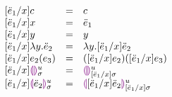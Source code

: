 \begin{figure}[h!]
\[
\begin{array}{lcl}
[\dexp_1 / x] c
&=&
c\\
{[\dexp_1 / x] x}
&=&
\dexp_1\\
{[\dexp_1 / x] y}
&=&
y\\
{[\dexp_1 / x] \dlam{y}{\dexp_2}}
&=&
{\dlam{y}{[\dexp_1 / x] \dexp_2}}
\\
{[\dexp_1 / x] \dap{e_2}{e_3}}
&=&
{\dapP{[\dexp_1 / x] e_2}{[\dexp_1 / x] e_3}}
\\
{[\dexp_1 / x]} \dehole{\mvar}{\subst}
&=&
\dehole{\mvar}{[\dexp_1 / x] \subst}
\\
{[\dexp_1 / x] \dhole{\dexp_2}{\mvar}{\subst}}
&=& 
\dhole{ [ \dexp_1 / x ] \dexp_2 }{\mvar}{[\dexp_1 / x] \subst}
\end{array}
\]
\end{figure}


